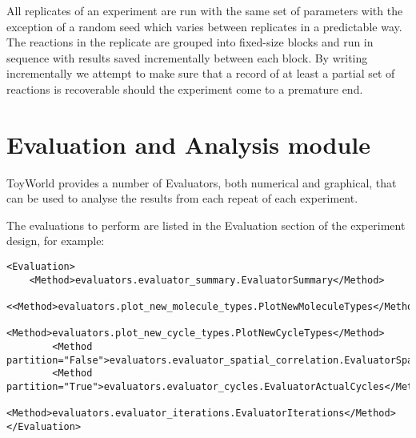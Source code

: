 All replicates of an experiment are run with the same set of parameters
with the exception of a random seed which varies between replicates in a
predictable way. The reactions in the replicate are grouped into
fixed-size blocks and run in sequence with results saved incrementally
between each block. By writing incrementally we attempt to make sure
that a record of at least a partial set of reactions is recoverable
should the experiment come to a premature end.

\section{Evaluation and Analysis module}\label{evaluation-and-analysis-module}

ToyWorld provides a number of Evaluators, both numerical and graphical,
that can be used to analyse the results from each repeat of each
experiment.

The evaluations to perform are listed in the Evaluation section of the
experiment design, for example:

\begin{verbatim}
<Evaluation>
    <Method>evaluators.evaluator_summary.EvaluatorSummary</Method>
        <<Method>evaluators.plot_new_molecule_types.PlotNewMoleculeTypes</Method>
        <Method>evaluators.plot_new_cycle_types.PlotNewCycleTypes</Method>
        <Method partition="False">evaluators.evaluator_spatial_correlation.EvaluatorSpatialCorrelation</Method>
        <Method partition="True">evaluators.evaluator_cycles.EvaluatorActualCycles</Method>
        <Method>evaluators.evaluator_iterations.EvaluatorIterations</Method>
</Evaluation>
\end{verbatim}